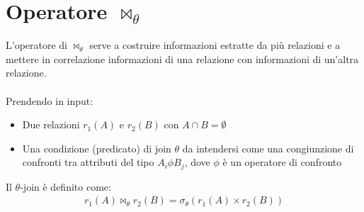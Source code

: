 \section{Operatore $\bowtie_{\theta}$}
L'operatore di $\bowtie_{\theta}$ serve a costruire informazioni estratte da più relazioni e a mettere in correlazione informazioni di una relazione con informazioni di un'altra relazione.\\\\
Prendendo in input:
    \begin{itemize}
        \item{Due relazioni $r_1(A)$ e $r_2(B)$ con $A \cap B = \emptyset$}
        \item{Una condizione (predicato) di join $\theta$ da intendersi come una congiunzione di confronti tra attributi del tipo $A_i \phi B_j$, dove $\phi$ è un operatore di confronto}
    \end{itemize}
Il $\theta$-join è definito come:
    \begin{equation}\begin{aligned}
        r_1(A) \bowtie_{\theta} r_2(B) = 
        \sigma_{\theta} (r_1(A) \times r_2(B))
    \end{aligned}\end{equation}

